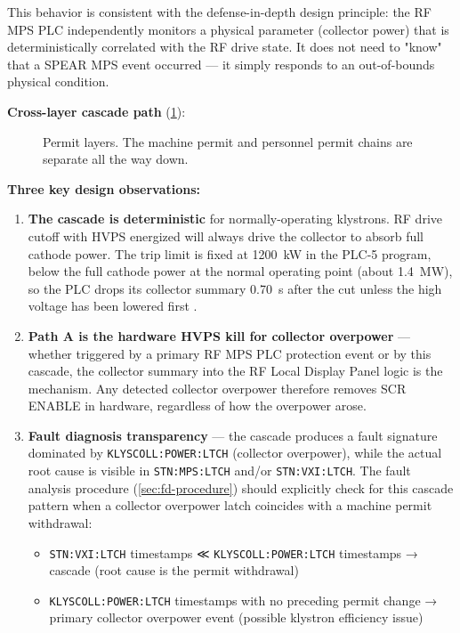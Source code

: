 This behavior is consistent with the defense-in-depth design principle: the RF MPS PLC independently monitors a physical parameter (collector power) that is deterministically correlated with the RF drive state. It does not need to "know" that a SPEAR MPS event occurred --- it simply responds to an out-of-bounds physical condition.

\textbf{Cross-layer cascade path} (\cref{fig:permit-layers}):

\begin{figure}[tbp]
\centering
\begin{fitpicture}\end{fitpicture}
\caption{Permit layers. The machine permit and personnel permit chains are separate all the way down.}\label{fig:permit-layers}
\end{figure}

\textbf{Three key design observations:}

\begin{enumerate}
\def\labelenumi{\arabic{enumi}.}
\item
  \textbf{The cascade is deterministic} for normally-operating klystrons. RF drive cutoff with HVPS energized will always drive the collector to absorb full cathode power. The trip limit is fixed at \qty{1200}{\kilo\watt} in the PLC-5 program, below the full cathode power at the normal operating point (about \qty{1.4}{\mega\watt}), so the PLC drops its collector summary \qty{0.70}{\second} after the cut unless the high voltage has been lowered first .
\item
  \textbf{Path A is the hardware HVPS kill for collector overpower} --- whether triggered by a primary RF MPS PLC protection event or by this cascade, the collector summary into the RF Local Display Panel logic is the mechanism. Any detected collector overpower therefore removes SCR ENABLE in hardware, regardless of how the overpower arose.
\item
  \textbf{Fault diagnosis transparency} --- the cascade produces a fault signature dominated by \texttt{KLYSCOLL:\allowbreak{}POWER:\allowbreak{}LTCH} (collector overpower), while the actual root cause is visible in \texttt{STN:MPS:LTCH} and/or \texttt{STN:VXI:LTCH}. The fault analysis procedure (\cref{sec:fd-procedure}) should explicitly check for this cascade pattern when a collector overpower latch coincides with a machine permit withdrawal:

  \begin{itemize}
  \tightlist
  \item
    \texttt{STN:VXI:LTCH} timestamps ≪ \texttt{KLYSCOLL:\allowbreak{}POWER:\allowbreak{}LTCH} timestamps → cascade (root cause is the permit withdrawal)
  \item
    \texttt{KLYSCOLL:\allowbreak{}POWER:\allowbreak{}LTCH} timestamps with no preceding permit change → primary collector overpower event (possible klystron efficiency issue)
  \end{itemize}
\end{enumerate}

